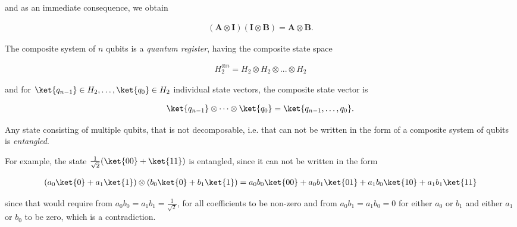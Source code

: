 and as an immediate consequence, we obtain 

\begin{align*}
  (\mathbf{A} \otimes \mathbf{I})(\mathbf{I} \otimes \mathbf{B}) = \mathbf{A} \otimes \mathbf{B}.
\end{align*}

\begin{definition}

The composite system of $n$ qubits is a \textit{quantum register}, having the composite state space

\begin{align*}
H_2^{\otimes{}n} = H_2 \otimes H_2 \otimes ... \otimes H_2
\end{align*}

and for $\ket{q_{n-1}} \in H_2, \dots, \ket{q_{0}} \in H_2$ individual state vectors, the composite state vector is

\begin{align*}
\ket{q_{n-1}} \otimes \dots \otimes \ket{q_{0}} = \ket{q_{n-1},\dots,q_0}.
\end{align*}

\end{definition}

\begin{definition}
Any state consisting of multiple qubits, that is not decomposable, i.e. that can not be written in the form of a composite system of qubits is \textit{entangled}.
\end{definition}

For example, the state $\frac{1}{\sqrt{2}}(\ket{00} + \ket{11})$ is entangled, since it can not be written in the form

\begin{align*}
(a_0\ket{0} + a_1\ket{1})\otimes(b_0\ket{0}+b_1\ket{1}) = a_0b_0\ket{00}+a_0b_1\ket{01}+a_1b_0\ket{10}+a_1b_1\ket{11}
\end{align*}

since that would require from $a_0b_0 = a_1b_1 = \frac{1}{\sqrt{2}}$, for all coefficients to be non-zero and from $a_0b_1 = a_1b_0 = 0$ for either $a_0$ or $b_1$ and either $a_1$ or $b_0$ to be zero, which is a contradiction.